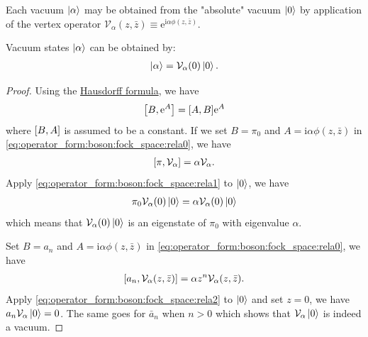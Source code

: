 \documentclass[10pt]{article}
\newcommand{\me}{\mathrm{e}}
\newcommand{\ii}{\mathrm{i}}
\begin{document}
Each vacuum $\ket{\alpha}$ may be obtained from the "absolute" vacuum $\ket{0}$ by application of the vertex operator $\mathcal{V}_\alpha(z,\bar{z})\equiv\me^{\ii\alpha\phi(z,\bar{z})}$.
\begin{claim}
    Vacuum states $\ket{\alpha}$ can be obtained by:  
    \begin{align}
        \ket{\alpha}=\mathcal{V}_\alpha(0)\ket{0}.
    \end{align}
\end{claim}
\begin{proof}
    Using the \href{https://en.wikipedia.org/wiki/Baker-Campbell-Hausdorff_formula}{Hausdorff formula}, we have 
    \begin{align}
        \comm{B}{\me^{A}}=\comm{A}{B}\me^{A}\label{eq:operator_form:boson:fock_space:rela0}
    \end{align}
    where $\comm{B}{A}$ is assumed to be a constant.
    If we set $B=\pi_0$ and $A=\ii\alpha\phi(z,\bar{z})$ in \cref{eq:operator_form:boson:fock_space:rela0}, we have 
    \begin{align}
        \comm{\pi}{\mathcal{V}_\alpha}=\alpha\mathcal{V}_\alpha.\label{eq:operator_form:boson:fock_space:rela1}
    \end{align}
    Apply \cref{eq:operator_form:boson:fock_space:rela1} to $\ket{0}$, we have 
    \begin{align}
        \pi_0\mathcal{V}_\alpha(0)\ket{0}=\alpha\mathcal{V}_\alpha(0)\ket{0}
    \end{align}
    which means that $\mathcal{V}_\alpha(0)\ket{0}$ is an eigenstate of $\pi_0$ with eigenvalue $\alpha$.
    
    Set $B=a_n$ and $A=\ii\alpha\phi(z,\bar{z})$ in \cref{eq:operator_form:boson:fock_space:rela0}, we have 
    \begin{align}
        \comm{a_n}{\mathcal{V}_\alpha(z,\bar{z})}=\alpha z^n \mathcal{V}_\alpha(z,\bar{z}).\label{eq:operator_form:boson:fock_space:rela2}
    \end{align}
    Apply \cref{eq:operator_form:boson:fock_space:rela2} to $\ket{0}$ and set $z=0$, we have $a_n\mathcal{V}_\alpha\ket{0}=0$.
    The same goes for $\bar{a}_n$ when $n>0$ which shows that $\mathcal{V}_\alpha\ket{0}$ is indeed a vacuum.
\end{proof}
\end{document}
